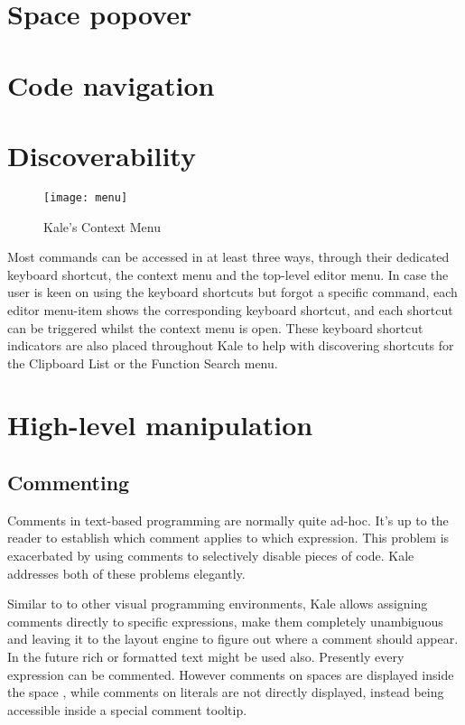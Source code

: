 \section{Space popover}
\label{soln:space_popover}

\section{Code navigation}

\needspace{8cm}
\section{Discoverability}
\begin{wrapfigure}[21]{r}{5.5cm}
\texttt{[image: menu]}
\caption{Kale's Context Menu}
\end{wrapfigure}
Most commands can be accessed in at least three ways, through their dedicated
keyboard shortcut, the context menu and the top-level editor menu. In case the
user is keen on using the keyboard shortcuts but forgot a specific command,
each editor menu-item shows the corresponding keyboard shortcut, and each
shortcut can be triggered whilst the context menu is open. These keyboard
shortcut indicators are also placed throughout Kale to help with discovering
shortcuts for the Clipboard List or the Function Search menu.

\section{High-level manipulation}

\subsection{Commenting}
Comments in text-based programming are normally quite ad-hoc. It's up to the
reader to establish which comment applies to which expression. This problem
is exacerbated by using comments to selectively disable pieces of code. Kale
addresses both of these problems elegantly.

Similar to to other visual
programming environments, Kale allows assigning comments directly to specific
expressions, make them completely unambiguous and leaving it to the layout
engine to figure out where a comment should appear. In the future rich or
formatted text might be used also. Presently every expression can be commented.
However comments on spaces are displayed inside the space , while
comments on literals are not directly displayed, instead being accessible
inside a special comment tooltip.

